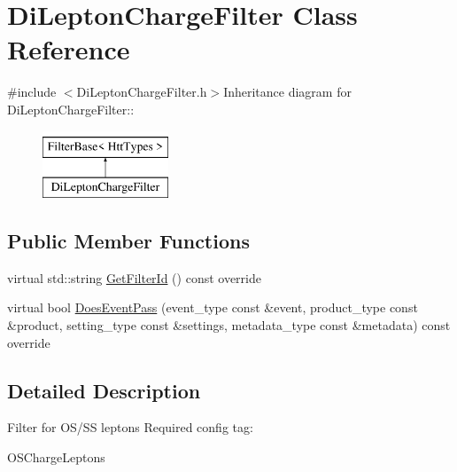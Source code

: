 \hypertarget{classDiLeptonChargeFilter}{
\section{DiLeptonChargeFilter Class Reference}
\label{classDiLeptonChargeFilter}
}


{\ttfamily \#include $<$DiLeptonChargeFilter.h$>$}Inheritance diagram for DiLeptonChargeFilter::\begin{figure}[H]
\begin{center}
\leavevmode
\includegraphics[height=2cm]{classDiLeptonChargeFilter}
\end{center}
\end{figure}
\subsection*{Public Member Functions}
\begin{DoxyCompactItemize}
\item 
virtual std::string \hyperlink{classDiLeptonChargeFilter_ac68bdf15416effa7af3240f26f12b75c}{GetFilterId} () const override
\item 
virtual bool \hyperlink{classDiLeptonChargeFilter_a7bce114de296aaef564457583b09e4ee}{DoesEventPass} (event\_\-type const \&event, product\_\-type const \&product, setting\_\-type const \&settings, metadata\_\-type const \&metadata) const override
\end{DoxyCompactItemize}


\subsection{Detailed Description}
Filter for OS/SS leptons Required config tag:
\begin{DoxyItemize}
\item OSChargeLeptons 
\end{DoxyItemize}


